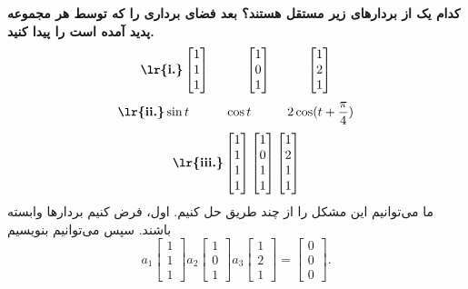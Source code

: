 \documentclass[a4paper,12pt]{report}
\begin{document}
      \hspace{-2cm}\textbf{}
      \textbf
      {
      	کدام یک از بردارهای زیر مستقل هستند؟ بعد فضای برداری را که توسط هر مجموعه پدید آمده است را پیدا کنید.
      }  
  	  $$
  	  \textbf{\lr{i.}}
  	  \begin{bmatrix}
  	  	1 \\ 1 \\ 1
  	  \end{bmatrix}
	  \hspace{1cm}
   	  \begin{bmatrix}
   	    	1 \\ 0 \\ 1
   	  \end{bmatrix}
      \hspace{1cm}
      \begin{bmatrix}
        	1 \\ 2 \\ 1
      \end{bmatrix}
  	  $$
  	  $$
  	  \textbf{\lr{ii.}} \sin t \hspace{1cm} \cos t \hspace{1cm} 2\cos (t+\frac{\pi}{4})
  	  $$
  	  $$
  	  \textbf{\lr{iii.}}
  	  \begin{bmatrix}
  	  	1 \\ 1 \\ 1 \\ 1
  	  \end{bmatrix}
      \begin{bmatrix}
      	1 \\ 0 \\ 1 \\ 1
      \end{bmatrix}
	  \begin{bmatrix}
	  	1 \\ 2 \\ 1 \\ 1
	  \end{bmatrix}
  	  $$
  	  \textbf{}
  	  ما می‌توانیم این مشکل را از چند طریق حل کنیم. اول، فرض کنیم بردارها وابسته باشند. سپس می‌توانیم بنویسیم
  	  $$
  	  a_1
  	  \begin{bmatrix}
  	  	1 \\ 1 \\ 1
  	  \end{bmatrix}
      a_2
      \begin{bmatrix}
      	1 \\ 0 \\ 1
      \end{bmatrix}
 	  a_3
 	  \begin{bmatrix}
 	  	1 \\ 2 \\ 1
 	  \end{bmatrix}
   	  =
   	  \begin{bmatrix}
   	  	0 \\ 0 \\ 0
   	  \end{bmatrix}.
  	  $$
\end{document}
